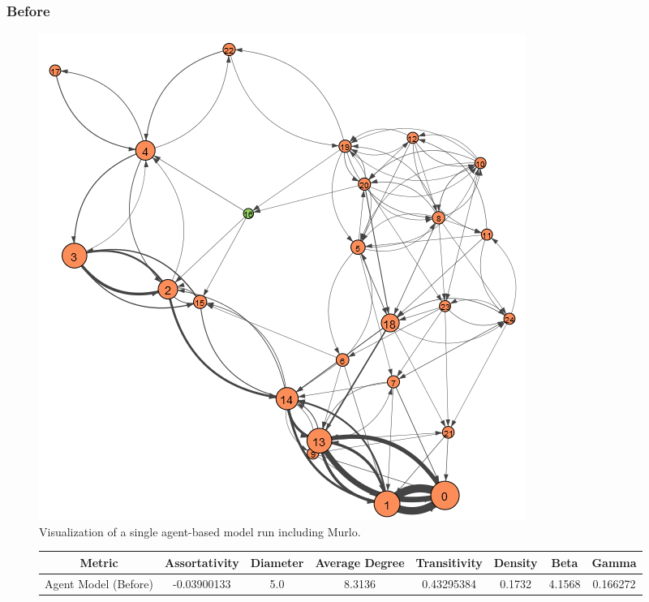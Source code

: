 \documentclass[12pt,a4paper]{thesis}
\begin{document}
\subsubsection{Before}

\begin{figure}[H]
\centering
\includegraphics[width=0.35\linewidth]{./BeforeViz/agent}
\caption{Visualization of a single agent-based model run including Murlo.}
\label{fig:agentBefore}
\end{figure}

\begin{figure}[H]
\centering
\tiny
\begin{tabular}{|c|c|c|c|c|c|c|c|}
\hline Metric & Assortativity & Diameter & Average Degree & Transitivity & Density & Beta & Gamma \\ 
\hline Agent Model (Before) & -0.03900133 & 5.0	& 8.3136 & 0.43295384 &	0.1732 & 4.1568	& 0.166272 \\ 
\hline 
\end{tabular} 
\end{figure}
\end{document}
